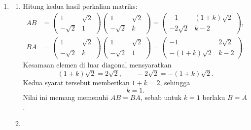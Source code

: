 \documentclass[11pt,a4paper]{article}
\begin{document}
\begin{enumerate}
\item
\begin{enumerate}
\item

Hitung kedua hasil perkalian matriks:
\begin{align*}
    AB
    &=\begin{pmatrix}1&\sqrt{2}\\-\sqrt{2}&1\end{pmatrix}
      \begin{pmatrix}1&\sqrt{2}\\-\sqrt{2}&k\end{pmatrix}
      =\begin{pmatrix}
          -1&(1+k)\sqrt{2}\\
          -2\sqrt{2}&k-2
       \end{pmatrix},\\[0.5em]
    BA
    &=\begin{pmatrix}1&\sqrt{2}\\-\sqrt{2}&k\end{pmatrix}
      \begin{pmatrix}1&\sqrt{2}\\-\sqrt{2}&1\end{pmatrix}
      =\begin{pmatrix}
          -1&2\sqrt{2}\\
          -(1+k)\sqrt{2}&k-2
       \end{pmatrix}.
\end{align*}
Kesamaan elemen di luar diagonal mensyaratkan
\[
    (1+k)\sqrt{2}=2\sqrt{2},\qquad
    -2\sqrt{2}=-(1+k)\sqrt{2}.
\]
Kedua syarat tersebut memberikan $1+k=2$, sehingga
\[
    \boxed{k=1}.
\]
Nilai ini memang memenuhi $AB=BA$, sebab untuk $k=1$ berlaku $B=A$.

\item


\end{enumerate}
\end{enumerate}
\end{document}
